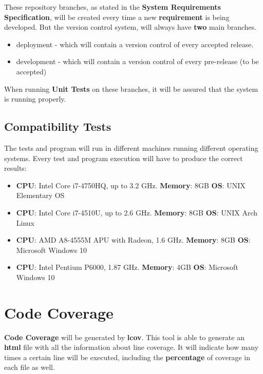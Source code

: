 \documentclass[12pt]{article}
\begin{document}
These repository branches, as stated in the \textbf{System Requirements Specification}, will be created every time a new \textbf{requirement} is being developed. But the version control system, will always have \textbf{two} main branches.

\begin{itemize}  
\item deployment - which will contain a version control of every accepted release. 
\item development - which will contain a version control of every pre-release (to be accepted)
\end{itemize}

When running \textbf{Unit Tests} on these branches, it will be assured that the system is running properly. 

\subsection*{Compatibility Tests}

The tests and program will run in different machines running different operating systems. Every test and program execution will have to produce the correct results:

\begin{itemize}  
\item \textbf{CPU}: Intel Core i7-4750HQ, up to 3.2 GHz. \textbf{Memory}: 8GB \textbf{OS}: UNIX Elementary OS
\item \textbf{CPU}: Intel Core i7-4510U, up to 2.6 GHz. \textbf{Memory}: 8GB \textbf{OS}: UNIX Arch Linux
\item \textbf{CPU}: AMD A8-4555M APU with Radeon, 1.6 GHz. \textbf{Memory}: 8GB \textbf{OS}: Microsoft Windows 10
\item \textbf{CPU}: Intel Pentium P6000, 1.87 GHz. \textbf{Memory}: 4GB \textbf{OS}: Microsoft Windows 10
\end{itemize}

\section*{Code Coverage}

\textbf{Code Coverage} will be generated by \textbf{lcov}. This tool is able to generate an \textbf{html} file with all the information about line coverage. It will indicate how many times a certain line will be executed, including the \textbf{percentage} of coverage in each file as well.
\end{document}

